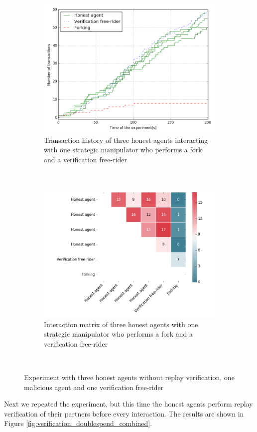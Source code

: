 \begin{figure}[h!]
    \begin{subfigure}{\textwidth}
      \centering
      \includegraphics[width=.6\linewidth]{images/verification_doublespend_honest}
      \caption{Transaction history of three honest agents interacting with one strategic manipulator who performs a fork and a verification free-rider}
      \label{fig:verification_doublespend_honest}
    \end{subfigure}\\
    \begin{subfigure}{\textwidth}
      \centering
      \includegraphics[width=.6\linewidth]{images/verification_doublespend_honest_matrix}
      \caption{Interaction matrix of three honest agents with one strategic manipulator who performs a fork and a verification free-rider}
      \label{fig:verification_doublespend_honest_matrix}
    \end{subfigure}\\
    \caption{Experiment with three honest agents without replay verification, one malicious agent 
    and one verification free-rider}
    \label{fig:verification_doublespend_honest_combined}
\end{figure}

Next we repeated the experiment, but this time the honest agents perform replay verification of their
partners before every interaction. The results are shown in Figure \ref{fig:verification_doublespend_combined}. 

